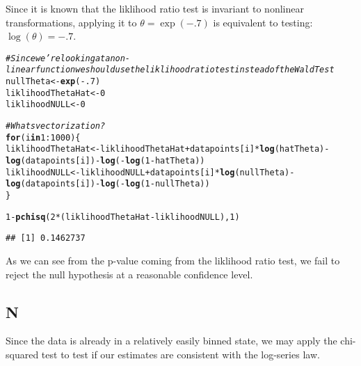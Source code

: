\documentclass[10pt]{paper}\usepackage[]{graphicx}\usepackage[]{color}
\makeatletter
\newcommand{\hlnum}[1]{\textcolor[rgb]{0.686,0.059,0.569}{#1}}%
\newcommand{\hlcom}[1]{\textcolor[rgb]{0.678,0.584,0.686}{\textit{#1}}}%
\newcommand{\hlopt}[1]{\textcolor[rgb]{0,0,0}{#1}}%
\newcommand{\hlstd}[1]{\textcolor[rgb]{0.345,0.345,0.345}{#1}}%
\newcommand{\hlkwa}[1]{\textcolor[rgb]{0.161,0.373,0.58}{\textbf{#1}}}%
\newcommand{\hlkwb}[1]{\textcolor[rgb]{0.69,0.353,0.396}{#1}}%
\newcommand{\hlkwd}[1]{\textcolor[rgb]{0.737,0.353,0.396}{\textbf{#1}}}%
\newenvironment{kframe}{%
 \def\at@end@of@kframe{}%
 \ifinner\ifhmode%
  \def\at@end@of@kframe{\end{minipage}}%
  \begin{minipage}{\columnwidth}%
 \fi\fi%
 \def\FrameCommand##1{\hskip\@totalleftmargin \hskip-\fboxsep
 \colorbox{shadecolor}{##1}\hskip-\fboxsep
     \hskip-\linewidth \hskip-\@totalleftmargin \hskip\columnwidth}%
 \MakeFramed {\advance\hsize-\width
   \@totalleftmargin\z@ \linewidth\hsize
   \@setminipage}}%
 {\par\unskip\endMakeFramed%
 \at@end@of@kframe}
\newenvironment{knitrout}{}{} %
\makeatother
\begin{document}
Since it is known that the liklihood ratio test is invariant to
nonlinear transformations, applying it to $\theta = \exp( -.7 )$ is
equivalent to testing: $\log(\theta) = -.7$.
\begin{knitrout}
\color{fgcolor}\begin{kframe}
\begin{alltt}
 \hlcom{#Since we're looking at a non-linear function we should use the liklihood ratio test instead of the Wald Test}
 \hlstd{nullTheta} \hlkwb{<-} \hlkwd{exp}\hlstd{(} \hlopt{-}\hlnum{.7} \hlstd{)}
 \hlstd{liklihoodThetaHat} \hlkwb{<-} \hlnum{0}
 \hlstd{liklihoodNULL} \hlkwb{<-} \hlnum{0}

 \hlcom{#Whats vectorization?}
  \hlkwa{for}\hlstd{( i} \hlkwa{in} \hlnum{1}\hlopt{:}\hlnum{1000} \hlstd{)\{}
      \hlstd{liklihoodThetaHat} \hlkwb{<-} \hlstd{liklihoodThetaHat} \hlopt{+} \hlstd{datapoints[i]}\hlopt{*}\hlkwd{log}\hlstd{( hatTheta)} \hlopt{-}
          \hlkwd{log}\hlstd{( datapoints[i])} \hlopt{-} \hlkwd{log}\hlstd{(} \hlopt{-} \hlkwd{log}\hlstd{(} \hlnum{1} \hlopt{-} \hlstd{hatTheta ) )}
      \hlstd{liklihoodNULL} \hlkwb{<-} \hlstd{liklihoodNULL} \hlopt{+} \hlstd{datapoints[i]}\hlopt{*}\hlkwd{log}\hlstd{( nullTheta)} \hlopt{-}
          \hlkwd{log}\hlstd{( datapoints[i])} \hlopt{-} \hlkwd{log}\hlstd{(} \hlopt{-} \hlkwd{log}\hlstd{(} \hlnum{1} \hlopt{-} \hlstd{nullTheta ) )}
 \hlstd{\}}

 \hlnum{1} \hlopt{-} \hlkwd{pchisq}\hlstd{(}\hlnum{2}\hlopt{*}\hlstd{( liklihoodThetaHat} \hlopt{-} \hlstd{liklihoodNULL ),}\hlnum{1}\hlstd{)}
\end{alltt}
\begin{verbatim}
## [1] 0.1462737
\end{verbatim}
\end{kframe}
\end{knitrout}
As we can see from the p-value coming from the liklihood ratio test,
we fail to reject the null hypothesis at a reasonable confidence
level.

\subsection*{N}
Since the data is already in a relatively easily binned state, we may
apply the chi-squared test to test if our estimates are consistent
with the log-series law. 
\end{document}
